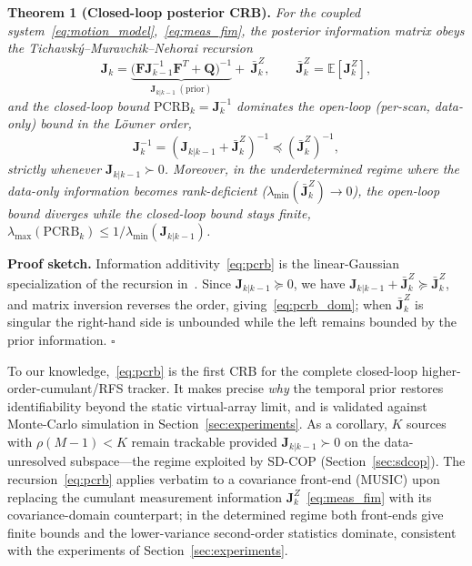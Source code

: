 \documentclass[journal]{IEEEtran}
\newcommand{\mat}[1]{\mathbf{#1}}
\newcommand{\E}{\mathbb{E}}
\begin{document}
\textbf{Theorem 1 (Closed-loop posterior CRB).}
\emph{For the coupled system~\eqref{eq:motion_model},~\eqref{eq:meas_fim}, the posterior information matrix obeys the Tichavsk\'{y}--Muravchik--Nehorai recursion}~\cite{tichavsky1998posterior}
\begin{equation}
\mat{J}_k = \underbrace{\big(\mat{F}\mat{J}_{k-1}^{-1}\mat{F}^T + \mat{Q}\big)^{-1}}_{\mat{J}_{k|k-1}\ (\mathrm{prior})} + \ \bar{\mat{J}}_k^{Z}, \qquad \bar{\mat{J}}_k^{Z} = \E[\mat{J}_k^Z],
\label{eq:pcrb}
\end{equation}
\emph{and the closed-loop bound $\mathrm{PCRB}_k = \mat{J}_k^{-1}$ dominates the open-loop (per-scan, data-only) bound in the L\"owner order,}
\begin{equation}
\mat{J}_k^{-1} = (\mat{J}_{k|k-1} + \bar{\mat{J}}_k^{Z})^{-1} \preceq (\bar{\mat{J}}_k^{Z})^{-1},
\label{eq:pcrb_dom}
\end{equation}
\emph{strictly whenever $\mat{J}_{k|k-1} \succ 0$. Moreover, in the underdetermined regime where the data-only information becomes rank-deficient ($\lambda_{\min}(\bar{\mat{J}}_k^Z) \to 0$), the open-loop bound diverges while the closed-loop bound stays finite, $\lambda_{\max}(\mathrm{PCRB}_k) \le 1/\lambda_{\min}(\mat{J}_{k|k-1})$.}

\textbf{Proof sketch.}
Information additivity~\eqref{eq:pcrb} is the linear-Gaussian specialization of the recursion in~\cite{tichavsky1998posterior}. Since $\mat{J}_{k|k-1} \succeq 0$, we have $\mat{J}_{k|k-1} + \bar{\mat{J}}_k^Z \succeq \bar{\mat{J}}_k^Z$, and matrix inversion reverses the order, giving~\eqref{eq:pcrb_dom}; when $\bar{\mat{J}}_k^Z$ is singular the right-hand side is unbounded while the left remains bounded by the prior information. \hfill$\square$

To our knowledge,~\eqref{eq:pcrb} is the first CRB for the complete closed-loop higher-order-cumulant/RFS tracker. It makes precise \emph{why} the temporal prior restores identifiability beyond the static virtual-array limit, and is validated against Monte-Carlo simulation in Section~\ref{sec:experiments}. As a corollary, $K$ sources with $\rho(M{-}1) < K$ remain trackable provided $\mat{J}_{k|k-1} \succ 0$ on the data-unresolved subspace---the regime exploited by SD-COP (Section~\ref{sec:sdcop}). The recursion~\eqref{eq:pcrb} applies verbatim to a covariance front-end (MUSIC) upon replacing the cumulant measurement information $\mat{J}_k^Z$~\eqref{eq:meas_fim} with its covariance-domain counterpart; in the determined regime both front-ends give finite bounds and the lower-variance second-order statistics dominate, consistent with the experiments of Section~\ref{sec:experiments}.
\end{document}
